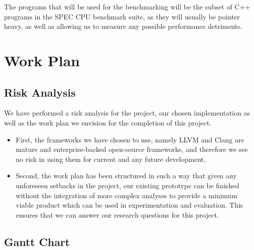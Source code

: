 \documentclass{proposal}
\begin{document}
    The programs that will be used for the benchmarking will be the subset of C++ programs in the SPEC CPU benchmark suite, as they will usually be pointer heavy, as well as allowing us to measure any possible performance detriments.




    \section{Work Plan}\label{sec:work-plan}

    \subsection{Risk Analysis}\label{subsec:risk-analysis}

    We have performed a risk analysis for the project, our chosen implementation as well as the work plan we envision for the completion of this project.
    \begin{itemize}
        \item First, the frameworks we have chosen to use, namely LLVM and Clang are mature and enterprise-backed open-source frameworks, and therefore we see no risk in using them for current and any future development,
        \item Second, the work plan has been structured in such a way that given any unforeseen setbacks in the project, our existing prototype can be finished without the integration of more complex analyses to provide a minimum viable product which can be used in experimentation and evaluation.
        This ensures that we can answer our research questions for this project.
    \end{itemize}


    \subsection{Gantt Chart}\label{subsec:gantt-chart}
\end{document}
